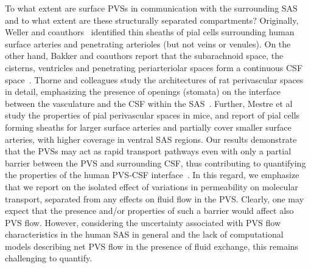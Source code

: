 \documentclass[fleqn,10pt]{wlscirep}
\begin{document}
To what extent are surface PVSs in communication with the surrounding
SAS and to what extent are these structurally separated compartments?
Originally, Weller and coauthors~\cite{zhang1990interrelationships,
  zhang1992directional, weller2005microscopic} identified thin sheaths
of pial cells surrounding human surface arteries and penetrating
arterioles (but not veins or venules). On the other hand, Bakker and
coauthors report that the subarachnoid space, the cisterns, ventricles
and penetrating periarteriolar spaces form a continuous CSF
space~\cite{bedussi2017paravascular}. Thorne and colleagues study the
architectures of rat perivascular spaces in detail, emphasizing the
presence of openings (stomata) on the interface between the
vasculature and the CSF within the SAS~\cite{pizzo2018intrathecal,
  hannocks2018molecular}. Further, Mestre et
al~\cite{mestre2022periarteriolar} study the properties of pial
perivascular spaces in mice, and report of pial cells forming sheaths
for larger surface arteries and partially cover smaller surface
arteries, with higher coverage in ventral SAS regions. Our results
demonstrate that the PVSs may act as rapid transport pathways even
with only a partial barrier between the PVS and surrounding CSF, thus
contributing to quantifying the properties of the human PVS-CSF
interface~\cite{eide2024functional}. In this regard, we emphasize that
we report on the isolated effect of variations in permeability on
molecular transport, separated from any effects on fluid flow in the
PVS. Clearly, one may expect that the presence and/or properties of
such a barrier would affect also PVS flow. However, considering the
uncertainty associated with PVS flow characteristics in the human SAS
in general and the lack of computational models describing net PVS
flow in the presence of fluid exchange, this remains challenging to
quantify.
\end{document}
